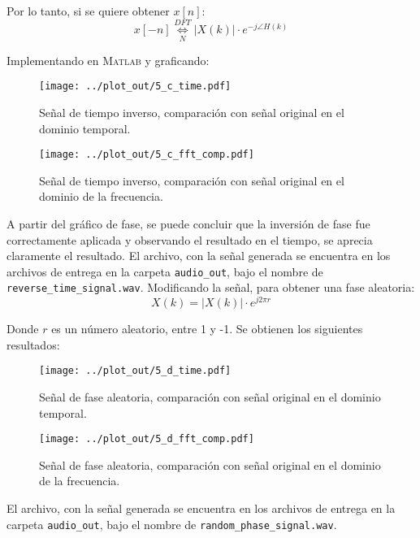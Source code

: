 		Por lo tanto, si se quiere obtener $x[n]$:
		\begin{equation}
		x[-n] \underset{N}{\overset{DFT}{ \Longleftrightarrow }} |X(k) | \cdot e^{-j \angle H(k)}
		\end{equation}
		
		Implementando en \textsc{Matlab} y graficando:
		\begin{figure}[H]
			\center
			\texttt{[image: ../plot\_out/5\_c\_time.pdf]}
			\caption{Señal de tiempo inverso, comparación con señal original en el dominio temporal.}
			\label{fig:5_c_temp}
		\end{figure}
		
		\begin{figure}[H]
			\center
			\texttt{[image: ../plot\_out/5\_c\_fft\_comp.pdf]}
			\caption{Señal de tiempo inverso, comparación con señal original en el dominio de la frecuencia.}
			\label{fig:5_c_frq}
		\end{figure}
		
		A partir del gráfico de fase, se puede concluir que la inversión de fase fue correctamente aplicada y observando el resultado en el tiempo, se aprecia claramente el resultado. El archivo, con la señal generada se encuentra en los archivos de entrega en la carpeta \texttt{audio\_out}, bajo el nombre de \texttt{reverse\_time\_signal.wav}. Modificando la señal, para obtener una fase aleatoria: 
		\begin{equation}
			X(k) = |X(k)|  \cdot e^{j 2\pi r}
		\end{equation}
		
	Donde $r$ es un número aleatorio, entre 1 y -1. Se obtienen los siguientes resultados:
	
			\begin{figure}[H]
			\center
			\texttt{[image: ../plot\_out/5\_d\_time.pdf]}
			\caption{Señal de fase aleatoria, comparación con señal original en el dominio temporal.}
			\label{fig:5_d_temp}
		\end{figure}
		
		\begin{figure}[H]
			\center
			\texttt{[image: ../plot\_out/5\_d\_fft\_comp.pdf]}
			\caption{Señal de fase aleatoria, comparación con señal original en el dominio de la frecuencia.}
			\label{fig:5_d_frq}
		\end{figure}
		
		El archivo, con la señal generada se encuentra en los archivos de entrega en la carpeta \texttt{audio\_out}, bajo el nombre de \texttt{random\_phase\_signal.wav}.